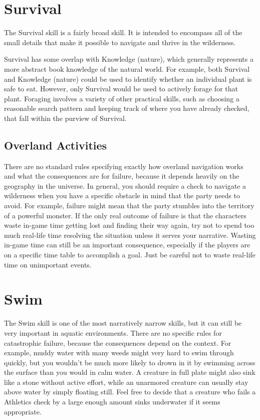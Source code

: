 \section{Survival}
  The Survival skill is a fairly broad skill.
  It is intended to encompass all of the small details that make it possible to navigate and thrive in the wilderness.

  Survival has some overlap with Knowledge (nature), which generally represents a more abstract book knowledge of the natural world.
  For example, both Survival and Knowledge (nature) could be used to identify whether an individual plant is safe to eat.
  However, only Survival would be used to actively forage for that plant.
  Foraging involves a variety of other practical skills, such as choosing a reasonable search pattern and keeping track of where you have already checked, that fall within the purview of Survival.

  \subsection{Overland Activities}
    There are no standard rules specifying exactly how overland navigation works and what the consequences are for failure, because it depends heavily on the geography in the universe.
    In general, you should require a check to navigate a wilderness when you have a specific obstacle in mind that the party needs to avoid.
    For example, failure might mean that the party stumbles into the territory of a powerful monster.
    If the only real outcome of failure is that the characters waste in-game time getting lost and finding their way again, try not to spend too much real-life time resolving the situation unless it serves your narrative.
    Wasting in-game time can still be an important consequence, especially if the players are on a specific time table to accomplish a goal.
    Just be careful not to waste real-life time on unimportant events.

\section{Swim}
  The Swim skill is one of the most narratively narrow skills, but it can still be very important in aquatic environments.
  There are no specific rules for catastrophic failure, because the consequences depend on the context.
  For example, muddy water with many weeds might very hard to swim through quickly, but you wouldn't be much more likely to drown in it by swimming across the surface than you would in calm water.
  A creature in full plate might also sink like a stone without active effort, while an unarmored creature can usually stay above water by simply floating still.
  Feel free to decide that a creature who fails a Athletics check by a large enough amount sinks underwater if it seems appropriate.
